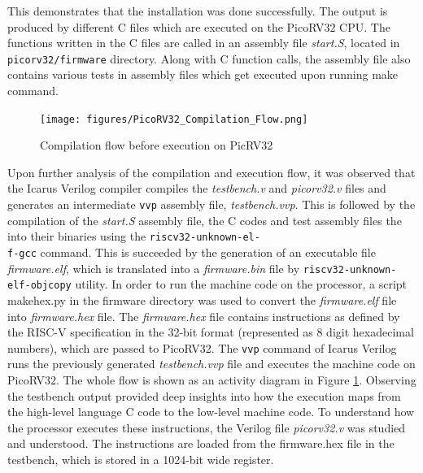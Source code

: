 This demonstrates that the installation was done successfully. The output is produced by different C files which are executed on the PicoRV32 CPU. The functions written in the C files are called in an assembly file \textit{start.S}, located in \verb|picorv32/firmware| directory. Along with C function calls, the assembly file also contains various tests in assembly files which get executed upon running make command. \newline
\begin{figure}[h!]
\centering
\texttt{[image: figures/PicoRV32\_Compilation\_Flow.png]}
\caption{Compilation flow before execution on PicRV32}
\label{fig:riscv5}
\end{figure}

Upon further analysis of the compilation and execution flow, it was observed that the Icarus Verilog compiler compiles the \textit{testbench.v} and \textit{picorv32.v} files and generates an intermediate \verb|vvp| assembly file, \textit{testbench.vvp}. This is followed by the compilation of the \textit{start.S} assembly file, the C codes and test assembly files the into their binaries using the \verb|riscv32-unknown-el-| \\ \verb|f-gcc| command. This is succeeded by the generation of an executable file \textit{firmware.elf}, which is translated into a \textit{firmware.bin} file by \verb|riscv32-unknown-| \\ \verb|elf-objcopy| utility. In order to run the machine code on the processor, a script makehex.py in the firmware directory was used to convert the \textit{firmware.elf} file into \textit{firmware.hex} file. The \textit{firmware.hex} file contains instructions as defined by the RISC-V specification in the 32-bit format (represented as 8 digit hexadecimal numbers), which are passed to PicoRV32. The \verb|vvp| command of Icarus Verilog runs the previously generated \textit{testbench.vvp} file and executes the machine code on PicoRV32. The whole flow is shown as an activity diagram in Figure \ref{fig:riscv5}.\newline\newline
Observing the testbench output provided deep insights into how the execution maps from the high-level language C code to the low-level machine code. To understand how the processor executes these instructions, the Verilog file \textit{picorv32.v} was studied and understood. The instructions are loaded from the firmware.hex file in the testbench, which is stored in a 1024-bit wide register.\newline
